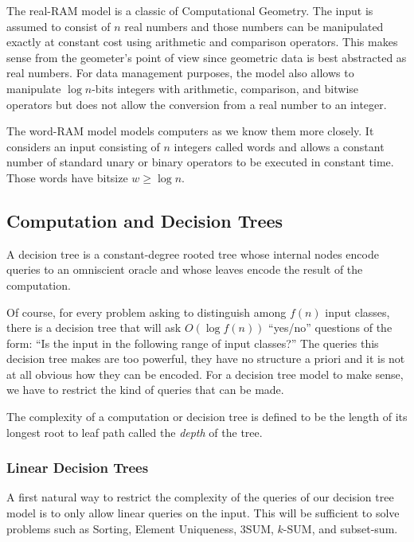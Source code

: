 The real-RAM model is a classic of Computational Geometry. The input is assumed
to consist of \(n\) real numbers and those numbers can be manipulated
exactly at constant cost using arithmetic and comparison operators.
This makes sense from the geometer's point of view since geometric data is
best abstracted as real numbers.
For data management purposes, the model also allows to manipulate \(\log
n\)-bits integers with arithmetic, comparison, and bitwise operators but does
not allow the conversion from a real number to an integer.

The word-RAM model models computers as we know them more closely. It considers
an input consisting of \(n\) integers called words and allows a constant number
of standard unary or binary operators to be executed in constant time. Those
words have bitsize \(w \geq \log n\).

\subsection{Computation and Decision Trees}%
\label{sec:models-of-computation:algorithms:trees}

A decision tree is a constant-degree rooted tree whose internal nodes encode
queries to an omniscient oracle and whose leaves encode the result of the
computation.


Of course, for every problem asking to distinguish among \(f(n)\) input
classes, there is a decision tree that will ask \(O(\log f(n))\)
``yes/no'' questions of
the form: ``Is the input in the following range of input classes?''
The queries this decision tree makes are too powerful, they have no
structure a priori and it is not at all obvious how they can be encoded.
For a decision tree model to make sense, we have to restrict the kind of
queries that can be made.

The complexity of a computation or decision tree is defined to be the length of
its longest root to leaf path called the \emph{depth} of the tree.

\subsubsection{Linear Decision Trees}

A first natural way to restrict the complexity of the queries of our decision
tree model is to only allow linear queries on the input. This will be
sufficient to solve problems such as Sorting, Element Uniqueness, 3SUM,
\(k\)-SUM, and subset-sum.

